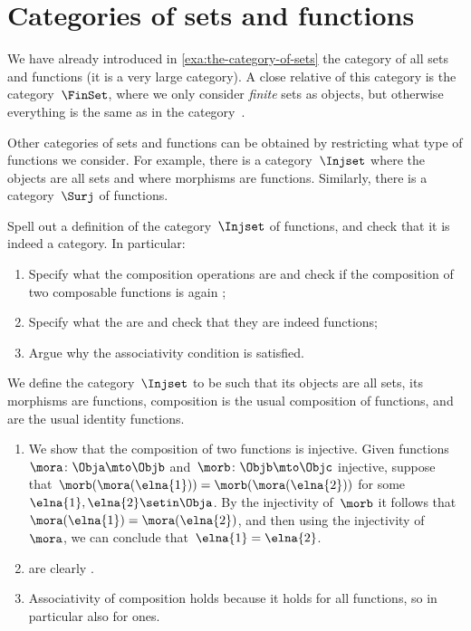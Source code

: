 
\section{Categories of sets and functions}

We have already introduced in \cref{exa:the-category-of-sets} the category of all sets and functions (it is a very large category). A close relative of this category is the category~$\FinSet$, where we only consider \emph{finite} sets as objects, but otherwise everything is the same as in the category~\Set.

Other categories of sets and functions can be obtained by restricting what type of functions we consider.
For example, there is a category~$\Injset$ where the objects are all sets and where morphisms are  functions.
Similarly, there is a category~$\Surj$ of  functions.

\begin{exercise}
    Spell out a definition of the category~$\Injset$ of  functions, and check that it is indeed a category.
    In particular:
    \begin{enumerate}
        \item Specify what the composition operations are and check if the composition of two composable  functions is again ;
        \item Specify what the   are and check that they are indeed  functions;
        \item Argue why the associativity condition is satisfied.
    \end{enumerate}
\end{exercise}

\begin{solution}
    We define the category~$\Injset$ to be such that its objects are all sets, its morphisms are  functions, composition is the usual composition of functions, and  are the usual identity functions.
    \begin{enumerate}
        \item We show that the composition of two  functions is injective.
              Given functions~$\mora \colon \Obja \mto \Objb$ and~$\morb \colon \Objb \mto \Objc$ injective, suppose that~$\morb(\mora (\elna{1})) = \morb(\mora (\elna{2}))$ for some~$\elna{1}, \elna{2} \setin \Obja$.
              By the injectivity of~$\morb$ it follows that~$\mora (\elna{1}) = \mora (\elna{2})$, and then using the injectivity of~$\mora$, we can conclude that~$\elna{1} = \elna{2}$.
        \item {} are clearly .
        \item Associativity of composition holds because it holds for all functions, so in particular also for  ones.
    \end{enumerate}
\end{solution}

